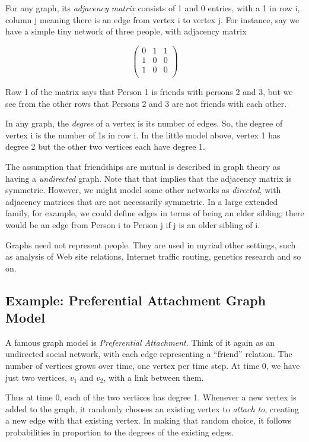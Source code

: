 For any graph, its {\it adjacency matrix} consists of 1 and 0 entries,
with a 1 in row i, column j meaning there is an edge from vertex i to
vertex j.  For instance, say we have a simple tiny network of three
people, with adjacency matrix

\begin{equation}
\label{graphex}
\left (
\begin{array}{rrr}
0 & 1 & 1 \\
1 & 0 & 0 \\
1 & 0 & 0 \\
\end{array}
\right )
\end{equation}

Row 1 of the matrix says that Person 1 is friends with persons 2 and 3,
but we see from the other rows that Persons 2 and 3 are not friends with
each other.

In any graph, the {\it degree} of a vertex is its number of edges.  So,
the degree of vertex i is the number of 1s in row i.  In the little
model above, vertex 1 has degree 2 but the other two vertices each have
degree 1.

The assumption that friendships are mutual is described in graph theory
as having a {\it undirected} graph.  Note that that implies that the
adjacency matrix is symmetric.  However, we might model some other
networks as {\it directed}, with adjacency matrices that are not
necessarily symmetric.  In a large extended family, for example, we
could define edges in terms of being an elder sibling; there would be an
edge from Person i to Person j if j is an older sibling of i.

Graphs need not represent people.  They are used in myriad other
settings, such as analysis of Web site relations, Internet traffic
routing, genetics research and so on.

\subsection{Example:  Preferential Attachment Graph Model}
\label{prefattach}

A famous graph model is {\it Preferential Attachment}.  Think of it
again as an undirected social network, with each edge representing a
``friend'' relation.  The number of vertices grows over time, one vertex
per time step.  At time 0, we have just two vertices, $v_1$ and $v_2$,
with a link between them.  

Thus at time 0, each of the two vertices has degree 1.  Whenever a new
vertex is added to the graph, it randomly chooses an existing vertex to
{\it attach to}, creating a new edge with that existing vertex.  In
making that random choice, it follows probabilities in proportion to the
degrees of the existing edges.


